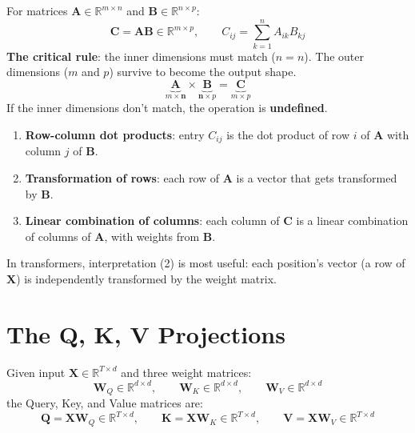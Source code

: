\documentclass[11pt, a4paper]{article}
\newcommand{\R}{\mathbb{R}}
\newcommand{\mW}{\bm{W}}
\newcommand{\mQ}{\bm{Q}}
\newcommand{\mK}{\bm{K}}
\newcommand{\mV}{\bm{V}}
\newcommand{\mX}{\bm{X}}
\begin{document}
\begin{formaldef}
For matrices $\bm{A} \in \R^{m \times n}$ and $\bm{B} \in \R^{n \times p}$:
\[
\bm{C} = \bm{A} \bm{B} \in \R^{m \times p}, \qquad C_{ij} = \sum_{k=1}^{n} A_{ik} B_{kj}
\]
\textbf{The critical rule}: the inner dimensions must match ($n = n$).
The outer dimensions ($m$ and $p$) survive to become the output shape.
\[
\underbrace{\bm{A}}_{m \times \mathbf{n}} \times \underbrace{\bm{B}}_{\mathbf{n} \times p} = \underbrace{\bm{C}}_{m \times p}
\]
If the inner dimensions don't match, the operation is \textbf{undefined}.
\end{formaldef}

\begin{intuition}
\begin{enumerate}[nosep]
  \item \textbf{Row-column dot products}: entry $C_{ij}$ is the dot product of
        row $i$ of $\bm{A}$ with column $j$ of $\bm{B}$.
  \item \textbf{Transformation of rows}: each row of $\bm{A}$ is a vector that
        gets transformed by $\bm{B}$.
  \item \textbf{Linear combination of columns}: each column of $\bm{C}$ is a
        linear combination of columns of $\bm{A}$, with weights from $\bm{B}$.
\end{enumerate}
In transformers, interpretation (2) is most useful: each position's vector (a row of $\mX$)
is independently transformed by the weight matrix.
\end{intuition}

\section{The Q, K, V Projections}

\begin{formaldef}
Given input $\mX \in \R^{T \times d}$ and three weight matrices:
\[
\mW_Q \in \R^{d \times d}, \qquad \mW_K \in \R^{d \times d}, \qquad \mW_V \in \R^{d \times d}
\]
the Query, Key, and Value matrices are:
\[
\mQ = \mX \mW_Q \in \R^{T \times d}, \qquad
\mK = \mX \mW_K \in \R^{T \times d}, \qquad
\mV = \mX \mW_V \in \R^{T \times d}
\]
\end{formaldef}
\end{document}
